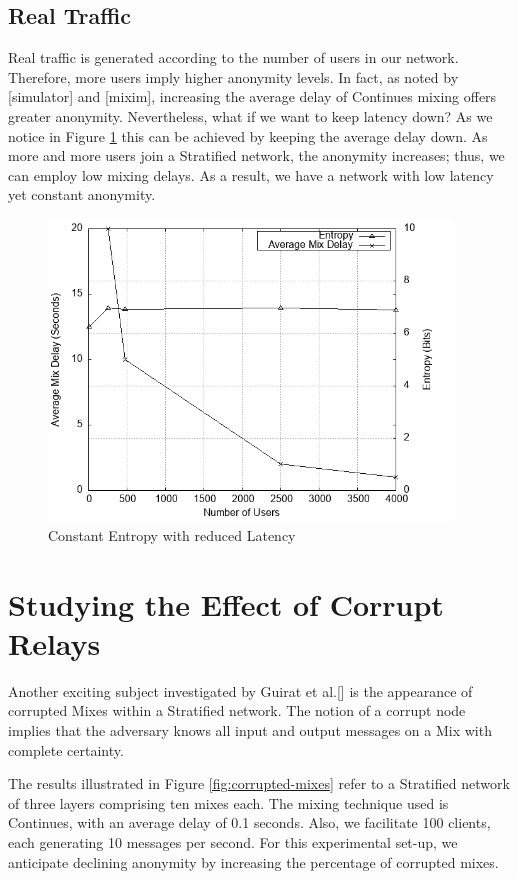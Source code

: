 \documentclass[logo,msc,cyber]{infthesis}   %
\begin{document}
\subsection{Real Traffic}

Real traffic is generated according to the number of users in our network.
Therefore, more users imply higher anonymity levels. In fact, as noted by
[simulator] and [mixim], increasing the average delay of Continues mixing offers
greater anonymity. Nevertheless, what if we want to keep latency down? As we
notice in Figure \ref{fig:nym-stratified-low-latency-constant-anonymity} this
can be achieved by keeping the average delay down. As more and more users join a
Stratified network, the anonymity increases; thus, we can employ low mixing
delays. As a result, we have a network with low latency yet constant anonymity.

\begin{figure}[h!]
    \centering
    \includegraphics[height=8cm]{figures/simulator/5.png}
    \caption{Constant Entropy with reduced Latency}
    \label{fig:nym-stratified-low-latency-constant-anonymity}
 \end{figure}

\section{Studying the Effect of Corrupt Relays}

Another exciting subject investigated by Guirat et al.[] is the appearance of
corrupted Mixes within a Stratified network. The notion of a corrupt node
implies that the adversary knows all input and output messages on a Mix with
complete certainty. 

The results illustrated in Figure \ref{fig:corrupted-mixes} refer to a
Stratified network of three layers comprising ten mixes each. The mixing technique
used is Continues, with an average delay of 0.1 seconds. Also, we facilitate 100
clients, each generating 10 messages per second. For this experimental set-up,
we anticipate declining anonymity by increasing the percentage of corrupted
mixes. 
\end{document}
